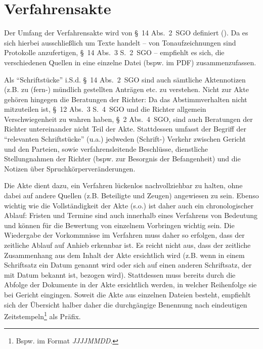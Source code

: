 \section{Verfahrensakte}
\label{Dokumentation:Akte}
Der Umfang der Verfahrensakte wird von \S~14 Abs.~2~SGO definiert ().
Da es sich hierbei ausschließlich um Texte handelt -- von Tonaufzeichnungen sind Protokolle anzufertigen, \S~14 Abs.~3 S.~2~SGO -- empfiehlt es sich, die verschiedenen Quellen in eine einzelne Datei (bspw. im PDF) zusammenzufassen.

Als \enquote{Schriftstücke} i.S.d. \S~14 Abs.~2~SGO sind auch sämtliche Aktennotizen (z.B. zu (fern-) mündlich gestellten Anträgen etc. zu verstehen.
Nicht zur Akte gehören hingegen die Beratungen der Richter:
Da das Abstimmverhalten nicht mitzuteilen ist, \S~12 Abs.~3 S.~4~SGO und die Richter allgemein Verschwiegenheit zu wahren haben, \S~2 Abs.~4~SGO, sind auch Beratungen der Richter untereinander nicht Teil der Akte.
Stattdessen umfasst der Begriff der \enquote{relevanten Schriftstücke} (u.a.) jedweden (Schrift-) Verkehr zwischen Gericht und den Parteien, sowie verfahrensleitende Beschlüsse, dienstliche Stellungnahmen der Richter (bspw. zur Besorgnis der Befangenheit) und die Notizen über Spruchkörperveränderungen.

Die Akte dient dazu, ein Verfahren lückenlos nachvollziehbar zu halten, ohne dabei auf andere Quellen (z.B. Beteiligte und Zeugen) angewiesen zu sein.
Ebenso wichtig wie die Vollständigkeit der Akte (s.o.) ist daher auch ein chronologischer Ablauf:
Fristen und Termine sind auch innerhalb eines Verfahrens von Bedeutung und können für die Bewertung von einzelnem Vorbringen wichtig sein.
Die Wiedergabe der Vorkommnisse im Verfahren muss daher so erfolgen, dass der zeitliche Ablauf auf Anhieb erkennbar ist.
Es reicht nicht aus, dass der zeitliche Zusammenhang aus dem Inhalt der Akte ersichtlich wird (z.B. wenn in einem Schriftsatz ein Datum genannt wird oder sich auf einen anderen Schriftsatz, der mit Datum bekannt ist, bezogen wird).
Stattdessen muss bereits durch die Abfolge der Dokumente in der Akte ersichtlich werden, in welcher Reihenfolge sie bei Gericht eingingen.
Soweit die Akte aus einzelnen Dateien besteht, empfiehlt sich der Übersicht halber daher die durchgängige Benennung nach eindeutigen Zeitstempeln\footnote{Bspw. im Format \emph{JJJJMMDD}.} als Präfix.

